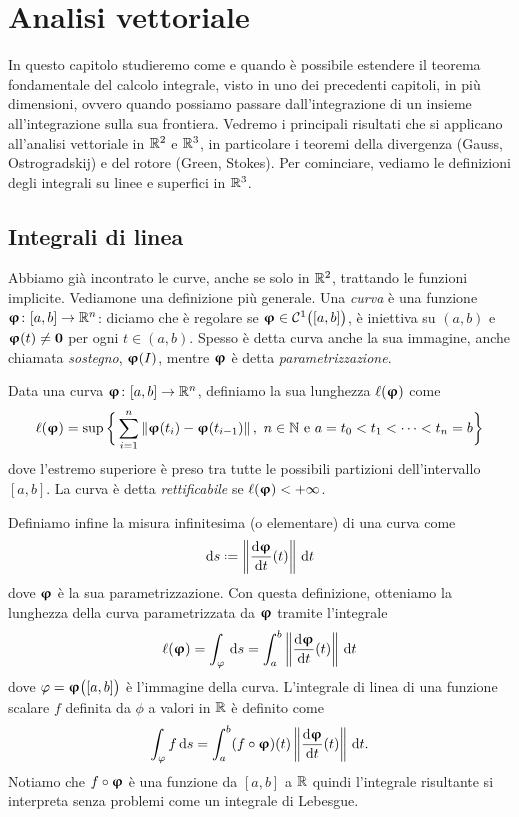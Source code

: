 \chapter{Analisi vettoriale}
In questo capitolo studieremo come e quando è possibile estendere il teorema fondamentale del calcolo integrale, visto in uno dei precedenti capitoli, in più dimensioni, ovvero quando possiamo passare dall'integrazione di un insieme all'integrazione sulla sua frontiera.
Vedremo i principali risultati che si applicano all'analisi vettoriale in $\mathbb{R}^2$ e $\mathbb{R}^3$, in particolare i teoremi della divergenza (Gauss, Ostrogradskij) e del rotore (Green, Stokes).
Per cominciare, vediamo le definizioni degli integrali su linee e superfici in $\mathbb{R}^3$.

\section{Integrali di linea}
Abbiamo già incontrato le curve, anche se solo in $\mathbb{R}^2$, trattando le funzioni implicite.
Vediamone una definizione più generale.
Una \emph{curva} è una funzione $\bm{\upvarphi}\colon [a,b]\to\mathbb{R}^n$: diciamo che è regolare se $\bm{\upvarphi}\in\mathcal{C}^{{1}}\big([a,b]\big)$, è iniettiva su $(a,b)$ e $\bm{\upvarphi}(t)\ne\mathbf{0}$ per ogni $t\in(a,b)$.
Spesso è detta curva anche la sua immagine, anche chiamata \emph{sostegno}, $\bm{\upvarphi}(I)$, mentre $\bm{\upvarphi}$ è detta \emph{parametrizzazione}.

\begin{definizione} \label{d:lunghezza-curva}
	Data una curva $\bm{\upvarphi}\colon[a,b]\to\mathbb{R}^n$, definiamo la sua lunghezza $\ell(\bm{\upvarphi})$ come
	\begin{equation}
		\ell(\vphi)=\sup\bigg\{\sum_{i=1}^n\norm{\vphi(t_i)-\vphi(t_{i-1})},\ n\in\N\text{ e }a=t_0<t_1<\cdots<t_n=b\bigg\}
		\label{eq:lunghezza-curva}
	\end{equation}
	dove l'estremo superiore è preso tra tutte le possibili partizioni dell'intervallo $[a,b]$.
	La curva è detta \emph{rettificabile} se $\ell(\bm{\upvarphi})<+\infty$.
\end{definizione}

Definiamo infine la misura infinitesima (o elementare) di una curva come
\begin{equation}
	\dd s\defeq\norm{\drv{\vphi}{t}(t)}\,\dd t
	\label{eq:misura-curva}
\end{equation}
dove $\bm{\upvarphi}$ è la sua parametrizzazione.
Con questa definizione, otteniamo la lunghezza della curva parametrizzata da $\bm{\upvarphi}$ tramite l'integrale
\begin{equation}
	\ell(\bm{\upvarphi})=\int_\varphi\,\textup{d} s=\int_a^b\left\|{\frac{\textup{d} {\bm{\upvarphi}}}{\textup{d} {t}}(t)}\right\|\,\textup{d} t
\end{equation}
dove $\varphi=\bm{\upvarphi}\big([a,b]\big)$ è l'immagine della curva.
L'integrale di linea di una funzione scalare $f$ definita da $\phi$ a valori in $\mathbb{R}$ è definito come
\begin{equation}
	\int_\varphi f\,\textup{d} s=\int_a^b(f\circ\bm{\upvarphi})(t)\left\|{\frac{\textup{d} {\bm{\upvarphi}}}{\textup{d} {t}}(t)}\right\|\,\textup{d} t.
\end{equation}
Notiamo che $f\circ\bm{\upvarphi}$ è una funzione da $[a,b]$ a $\mathbb{R}$ quindi l'integrale risultante si interpreta senza problemi come un integrale di Lebesgue.

